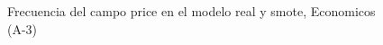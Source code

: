 \begin{figure}[H]
    \centering
    
    \caption{Frecuencia del campo  price en el modelo real y smote, Economicos (A-3)}
    \label{frecuency- Price-smote-enc}
\end{figure}
